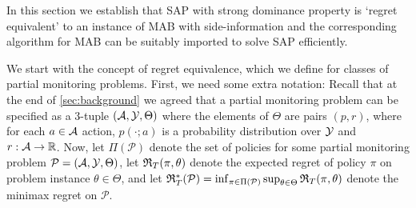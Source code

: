\newcommand{\one}[1]{\mathbb{I}_{\{#1\}}}
\newcommand{\Pside}{\P_{\mathrm{side}}\xspace}
\newcommand{\PSAP}{\P_{\mathrm{SAP}}\xspace}
\renewcommand{\P}{\mathcal{P}}

In this section we establish that SAP with strong dominance property is `regret equivalent' to an instance of MAB with side-information and the corresponding algorithm for MAB can be suitably imported to solve SAP efficiently.   

We start with the concept of regret equivalence, which we define for classes of partial monitoring problems.
First, we need some extra notation: Recall that at the end of \cref{sec:background} we agreed that 
a partial monitoring problem can be specified as a 3-tuple $(\mathcal{A},\mathcal{Y},\Theta)$ where the elements of $\Theta$ are pairs $(p,r)$,
where for each $a\in \mathcal{A}$ action, $p(\cdot;a)$ is a probability distribution over $\mathcal{Y}$ and $r: \mathcal{A} \to \mathbb{R}$.
Now, let $\Pi(\P)$ denote the set of policies for some partial monitoring problem $\P = (\A,\Y,\Theta)$,
let $\mathfrak{R}_T(\pi,\theta)$ denote the expected regret of policy $\pi$ on problem instance $\theta\in \Theta$,
and let $\Regret_T^*(\P) = \inf_{\pi\in \Pi(\P)}\sup_{\theta\in \Theta} \Regret_T(\pi,\theta)$ denote the minimax regret on $\P$.

